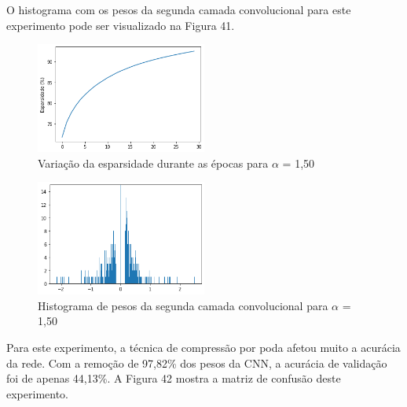 O histograma com os pesos da segunda camada convolucional para este experimento pode ser visualizado na Figura 41.

\begin{figure}[H]
	\includegraphics[width=0.5\textwidth, keepaspectratio=true]{figuras/CAP4/esparsidade150.png}
	\centering
	\caption[Variação da esparsidade durante as épocas para $\alpha$ = 1,50]{Variação da esparsidade durante as épocas para $\alpha$ = 1,50}
\end{figure}

\begin{figure}[H]
	\includegraphics[width=0.5\textwidth, keepaspectratio=true]{figuras/CAP4/hist_150_.png}
	\centering
	\caption[Histograma de pesos da segunda camada convolucional para $\alpha$ = 1,50]{Histograma de pesos da segunda camada convolucional para $\alpha$ = 1,50}
\end{figure}

Para este experimento, a técnica de compressão por poda afetou muito a acurácia da rede. Com a remoção de 97,82\% dos pesos da CNN, a acurácia de validação foi de apenas 44,13\%. A Figura 42 mostra a matriz de confusão deste experimento.


